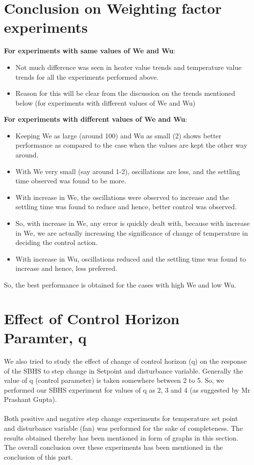 \section{Conclusion on Weighting factor experiments}
\textbf{For experiments with same values of We and Wu}:
\begin{itemize}
\item Not much difference was seen in heater value trends and temperature value trends for all the experiments performed above.
\item Reason for this will be clear from the discussion on the trends mentioned below (for experiments with different values of We and Wu)
\end{itemize}
\textbf{For experiments with different values of We and Wu}:
\begin{itemize}
\item Keeping We as large (around 100) and Wu as small (2) shows better performance as compared to the case when the values are kept the other way around.
\item With We very small (say around 1-2), oscillations are less, and the settling time observed was found to be more.
\item With increase in We, the oscillations were observed to increase and the settling time was found to reduce and hence, better control was observed.
\item So, with increase in We, any error is quickly dealt with, because with increase in We, we are actually increasing the significance of change of temperature in deciding the control action.
\item With increase in Wu, oscillations reduced and the settling time was found to increase and hence, less preferred.
\end{itemize}
So, the best performance is obtained for the cases with high We and low Wu.


\section{Effect of Control Horizon Paramter, q}
We also tried to study the effect of change of control horizon (q) on the response of the SBHS to step change in Setpoint and disturbance variable. Generally the value of q (control parameter) is taken somewhere between 2 to 5. So, we performed our SBHS experiment for values of q as 2, 3 and 4 (as suggested by Mr Prashant Gupta). \\ \\
Both positive and negative step change experiments for temperature set point and disturbance variable (fan) was performed for the sake of completeness. The results obtained thereby has been mentioned in form of graphs in this section. The overall conclusion over these experiments has been mentioned in the conclusion of this part.

